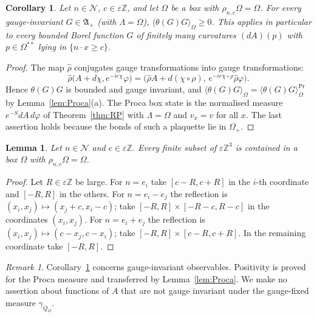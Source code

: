 \documentclass[11pt]{amsart}
\theoremstyle{plain}
\newtheorem{lemma}[theorem]{Lemma}
\newtheorem{corollary}[theorem]{Corollary}
\theoremstyle{definition}
\theoremstyle{remark}
\newtheorem{remark}[theorem]{Remark}
\numberwithin{equation}{section}
\newcommand{\Z}{\mathbb{Z}}
\newcommand{\eps}{\varepsilon}
\newcommand{\cN}{\mathcal{N}}
\newcommand{\fA}{\mathfrak{A}}
\newcommand{\ev}[1]{\langle #1\rangle}
\begin{document}
\begin{corollary}\label{cor:RPbox}
Let $n\in\cN$, $c\in\eps\Z$, and let $\Omega$ be a box with $\rho_{n,c}\Omega=\Omega$. For every gauge-invariant $G\in\fA_+$ (with $\Lambda=\Omega$), $\ev{\theta(G)G}_\Omega\ge0$. This applies in particular to every bounded Borel function $G$ of finitely many curvatures $(dA)(p)$ with $p\in\Omega^{**}$ lying in $\{n\cdot x\ge c\}$.
\end{corollary}

\begin{proof}
The map $\hat\rho$ conjugates gauge transformations into gauge transformations:
\[
\hat\rho\big(A+d\chi,e^{-ie\chi}\varphi\big)=\big(\hat\rho A+d(\chi\circ\rho),\,e^{-ie\chi\circ\rho}\hat\rho\varphi\big).
\] Hence $\theta(G)G$ is bounded and gauge invariant, and $\ev{\theta(G)G}_\Omega=\ev{\theta(G)G}^{\mathrm{Pr}}_\Omega$ by Lemma~\ref{lem:Proca}(a). The Proca box state is the normalised measure $e^{-S}dA\,d\varphi$ of Theorem~\ref{thm:RP} with $\Lambda=\Omega$ and $v_x=v$ for all $x$. The last assertion holds because the bonds of such a plaquette lie in $\Omega_+$.
\end{proof}

\begin{lemma}\label{lem:invboxes}
Let $n\in\cN$ and $c\in\eps\Z$. Every finite subset of $\eps\Z^3$ is contained in a box $\Omega$ with $\rho_{n,c}\Omega=\Omega$.
\end{lemma}

\begin{proof}
Let $R\in\eps\Z$ be large. For $n=e_i$ take $[c-R,c+R]$ in the $i$-th coordinate and $[-R,R]$ in the others. For $n=e_i-e_j$ the reflection is $(x_i,x_j)\mapsto(x_j+c,x_i-c)$; take $[-R,R]\times[-R-c,R-c]$ in the coordinates $(x_i,x_j)$. For $n=e_i+e_j$ the reflection is $(x_i,x_j)\mapsto(c-x_j,c-x_i)$; take $[-R,R]\times[c-R,c+R]$. In the remaining coordinate take $[-R,R]$.
\end{proof}

\begin{remark}\label{rem:gaugeRP}
Corollary~\ref{cor:RPbox} concerns gauge-invariant observables. Positivity is proved for the Proca measure and transferred by Lemma~\ref{lem:Proca}. We make no assertion about functions of $A$ that are not gauge invariant under the gauge-fixed measure $\gamma_{Q_\Omega}$.
\end{remark}
\end{document}
